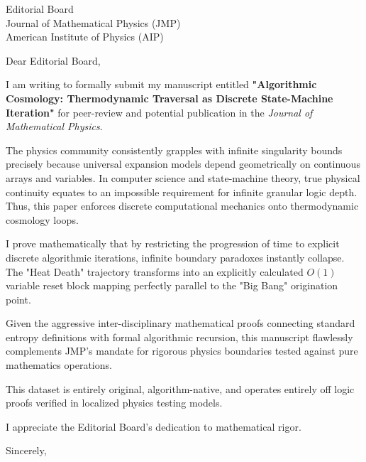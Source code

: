 \documentclass[11pt,a4paper]{letter}
\begin{document}
\begin{letter}{Editorial Board \\ Journal of Mathematical Physics (JMP) \\ American Institute of Physics (AIP)}

\opening{Dear Editorial Board,}

I am writing to formally submit my manuscript entitled \textbf{"Algorithmic Cosmology: Thermodynamic Traversal as Discrete State-Machine Iteration"} for peer-review and potential publication in the \textit{Journal of Mathematical Physics}.

The physics community consistently grapples with infinite singularity bounds precisely because universal expansion models depend geometrically on continuous arrays and variables. In computer science and state-machine theory, true physical continuity equates to an impossible requirement for infinite granular logic depth. Thus, this paper enforces discrete computational mechanics onto thermodynamic cosmology loops.

I prove mathematically that by restricting the progression of time to explicit discrete algorithmic iterations, infinite boundary paradoxes instantly collapse. The "Heat Death" trajectory transforms into an explicitly calculated \(O(1)\) variable reset block mapping perfectly parallel to the "Big Bang" origination point. 

Given the aggressive inter-disciplinary mathematical proofs connecting standard entropy definitions with formal algorithmic recursion, this manuscript flawlessly complements JMP’s mandate for rigorous physics boundaries tested against pure mathematics operations.

This dataset is entirely original, algorithm-native, and operates entirely off logic proofs verified in localized physics testing models.

I appreciate the Editorial Board’s dedication to mathematical rigor.

\closing{Sincerely,}

\end{letter}
\end{document}
